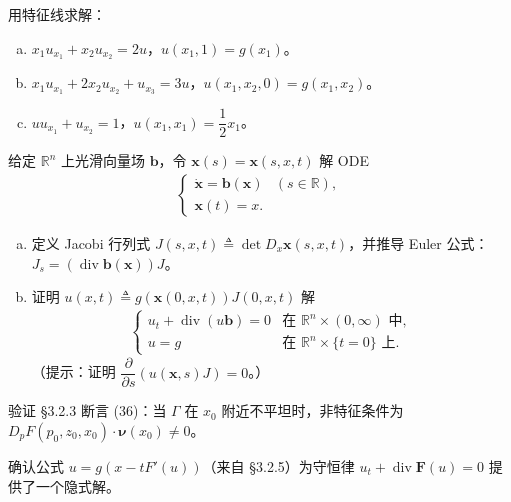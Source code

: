 \documentclass[../../main.tex]{subfiles}
\begin{document}
\begin{exercise}\label{exercise:ch03-5}
用特征线求解：
\begin{enumerate}[(a)]
\item $x_1u_{x_1}+x_2u_{x_2}=2u$，$u(x_1,1)=g(x_1)$。
\item $x_1u_{x_1}+2x_2u_{x_2}+u_{x_3}=3u$，$u(x_1,x_2,0)=g(x_1,x_2)$。
\item $u u_{x_1}+u_{x_2}=1$，$u(x_1,x_1)=\dfrac{1}{2}x_1$。
\end{enumerate}
\end{exercise}

\begin{exercise}\label{exercise:ch03-6}
给定 $\mathbb{R}^n$ 上光滑向量场 $\mathbf{b}$，令 $\mathbf{x}(s)=\mathbf{x}(s,x,t)$ 解 ODE
\begin{align*}
\begin{cases}
\dot{\mathbf{x}}=\mathbf{b}(\mathbf{x}) & (s\in\mathbb{R}),\\
\mathbf{x}(t)=x.
\end{cases}
\end{align*}
\begin{enumerate}[(a)]
\item 定义 Jacobi 行列式 $J(s,x,t)\triangleq\det D_x\mathbf{x}(s,x,t)$，并推导 Euler 公式：$J_s=(\operatorname{div}\mathbf{b}(\mathbf{x}))J$。
\item 证明 $u(x,t)\triangleq g(\mathbf{x}(0,x,t))J(0,x,t)$ 解
\begin{align*}
\begin{cases}
u_t+\operatorname{div}(u\mathbf{b})=0 & \text{在 }\mathbb{R}^n\times(0,\infty)\text{ 中},\\
u=g & \text{在 }\mathbb{R}^n\times\{t=0\}\text{ 上}.
\end{cases}
\end{align*}
（提示：证明 $\dfrac{\partial}{\partial s}(u(\mathbf{x},s)J)=0$。）
\end{enumerate}
\end{exercise}

\begin{exercise}\label{exercise:ch03-7}
验证 \S3.2.3 断言 (36)：当 $\Gamma$ 在 $x_0$ 附近不平坦时，非特征条件为 $D_pF(p_0,z_0,x_0)\cdot\boldsymbol{\nu}(x_0)\neq 0$。
\end{exercise}

\begin{exercise}\label{exercise:ch03-8}
确认公式 $u=g(x-tF'(u))$（来自 \S3.2.5）为守恒律 $u_t+\operatorname{div}\mathbf{F}(u)=0$ 提供了一个隐式解。
\end{exercise}
\end{document}

